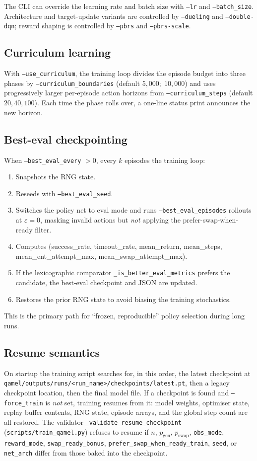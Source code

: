 \documentclass[11pt]{article}
\newcommand{\code}[1]{\texttt{#1}}
\newcommand{\file}[1]{\texttt{\small #1}}
\newcommand{\pgen}{p_{\text{gen}}}
\newcommand{\pswap}{p_{\text{swap}}}
\begin{document}
The CLI can override the learning rate and batch size with \code{--lr} and \code{--batch\_size}. Architecture and target-update variants are controlled by \code{--dueling} and \code{--double-dqn}; reward shaping is controlled by \code{--pbrs} and \code{--pbrs-scale}.

\subsection{Curriculum learning}
\label{sec:curriculum}
With \code{--use\_curriculum}, the training loop divides the episode budget into three phases by \code{--curriculum\_boundaries} (default $5{,}000;\;10{,}000$) and uses progressively larger per-episode action horizons from \code{--curriculum\_steps} (default $20,40,100$). Each time the phase rolls over, a one-line status print announces the new horizon.

\subsection{Best-eval checkpointing}
\label{sec:besteval}
When \code{--best\_eval\_every} $> 0$, every $k$ episodes the training loop:
\begin{enumerate}
  \item Snapshots the RNG state.
  \item Reseeds with \code{--best\_eval\_seed}.
  \item Switches the policy net to eval mode and runs \code{--best\_eval\_episodes} rollouts at $\varepsilon=0$, masking invalid actions but \emph{not} applying the prefer-swap-when-ready filter.
  \item Computes (success\_rate, timeout\_rate, mean\_return, mean\_steps, mean\_ent\_attempt\_max, mean\_swap\_attempt\_max).
  \item If the lexicographic comparator \code{\_is\_better\_eval\_metrics} prefers the candidate, the best-eval checkpoint and JSON are updated.
  \item Restores the prior RNG state to avoid biasing the training stochastics.
\end{enumerate}
This is the primary path for ``frozen, reproducible'' policy selection during long runs.

\subsection{Resume semantics}
\label{sec:resume}
On startup the training script searches for, in this order, the latest checkpoint at\\\file{qamel/outputs/runs/\textless run\_name\textgreater/checkpoints/latest.pt}, then a legacy checkpoint location, then the final model file. If a checkpoint is found and \code{--force\_train} is \emph{not} set, training resumes from it: model weights, optimiser state, replay buffer contents, RNG state, episode arrays, and the global step count are all restored. The validator \code{\_validate\_resume\_checkpoint} (\file{scripts/train\_qamel.py}) refuses to resume if $n$, $\pgen$, $\pswap$, \code{obs\_mode}, \code{reward\_mode}, \code{swap\_ready\_bonus}, \code{prefer\_swap\_when\_ready\_train}, \code{seed}, or \code{net\_arch} differ from those baked into the checkpoint.
\end{document}
